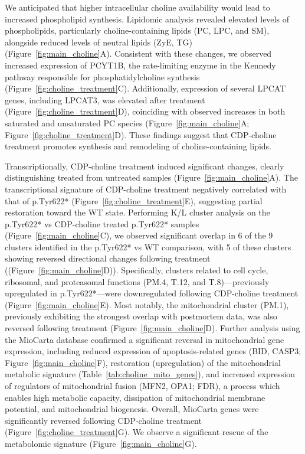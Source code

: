 We anticipated that higher intracellular choline availability would lead to increased phospholipid synthesis. Lipidomic analysis revealed elevated levels of phospholipids, particularly choline-containing lipids (PC, LPC, and SM), alongside reduced levels of neutral lipids (ZyE, TG) (Figure~\ref{fig:main_choline}A). Consistent with these changes, we observed increased expression of PCYT1B, the rate-limiting enzyme in the Kennedy pathway responsible for phosphatidylcholine synthesis (Figure~\ref{fig:choline_treatment}C). Additionally, expression of several LPCAT genes, including LPCAT3, was elevated after treatment (Figure~\ref{fig:choline_treatment}D), coinciding with observed increases in both saturated and unsaturated PC species (Figure~\ref{fig:main_choline}A; Figure~\ref{fig:choline_treatment}D). These findings suggest that CDP-choline treatment promotes synthesis and remodeling of choline-containing lipids.

Transcriptionally, CDP-choline treatment induced significant changes, clearly distinguishing treated from untreated samples (Figure~\ref{fig:main_choline}A). The transcriptional signature of CDP-choline treatment negatively correlated with that of p.Tyr622* (Figure~\ref{fig:choline_treatment}E), suggesting partial restoration toward the WT state. Performing K/L cluster analysis on the p.Tyr622* vs CDP-choline treated p.Tyr622* samples (Figure~\ref{fig:main_choline}C), we observed significant overlap in 6 of the 9 clusters identified in the p.Tyr622* vs WT comparison, with 5 of these clusters showing reversed directional changes following treatment ((Figure~\ref{fig:main_choline}D)). Specifically, clusters related to cell cycle, ribosomal, and proteasomal functions (PM.4, T.12, and T.8)—previously upregulated in p.Tyr622*—were downregulated following CDP-choline treatment (Figure~\ref{fig:main_choline}E). Most notably, the mitochondrial cluster (PM.1), previously exhibiting the strongest overlap with postmortem data, was also reversed following treatment (Figure~\ref{fig:main_choline}D). Further analysis using the MioCarta database confirmed a significant reversal in mitochondrial gene expression, including reduced expression of apoptosis-related genes (BID, CASP3; Figure~\ref{fig:main_choline}F), restoration (upregulation) of the mitochondrial metabolic signature (Table~\ref{tab:choline_mito_genes}), and increased expression of regulators of mitochondrial fusion (MFN2, OPA1; FDR), a process which enables high metabolic capacity, dissipation of mitochondrial membrane potential, and mitochondrial biogenesis. Overall, MioCarta genes were significantly reversed following CDP-choline treatment (Figure~\ref{fig:choline_treatment}G). We observe a significant rescue of the metabolomic signature (Figure~\ref{fig:main_choline}G).

